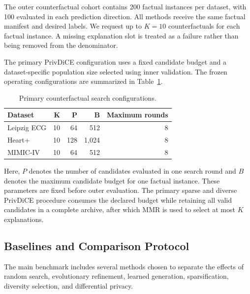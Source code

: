 \documentclass[preprint,12pt]{elsarticle}
\begin{document}
The outer counterfactual cohort contains 200 factual instances per dataset,
with 100 evaluated in each prediction direction. All methods receive the same
factual manifest and desired labels. We request up to $K=10$
counterfactuals for each factual instance. A missing explanation slot is
treated as a failure rather than being removed from the denominator.

The primary PrivDiCE configuration uses a fixed candidate budget and a
dataset-specific population size selected using inner validation. The frozen
operating configurations are summarized in
Table~\ref{tab:cfe_operating_points}.

\begin{table}[t]
\centering
\caption{Primary counterfactual search configurations.}
\label{tab:cfe_operating_points}
\begin{tabular}{lrrrr}
\toprule
\textbf{Dataset} & $\boldsymbol{K}$ & $\boldsymbol{P}$ &
$\boldsymbol{B}$ & \textbf{Maximum rounds} \\
\midrule
Leipzig ECG & 10 & 64  & 512   & 8 \\
Heart+      & 10 & 128 & 1,024 & 8 \\
MIMIC-IV    & 10 & 64  & 512   & 8 \\
\bottomrule
\end{tabular}
\end{table}

Here, $P$ denotes the number of candidates evaluated in one search round and
$B$ denotes the maximum candidate budget for one factual instance. These
parameters are fixed before outer evaluation. The primary sparse and diverse
PrivDiCE procedure consumes the declared budget while retaining all valid
candidates in a complete archive, after which MMR is used to select at most
$K$ explanations.

\subsection{Baselines and Comparison Protocol}
\label{subsec:models_baselines}

The main benchmark includes several methods chosen to separate the effects of
random search, evolutionary refinement, learned generation, sparsification,
diversity selection, and differential privacy.
\end{document}
